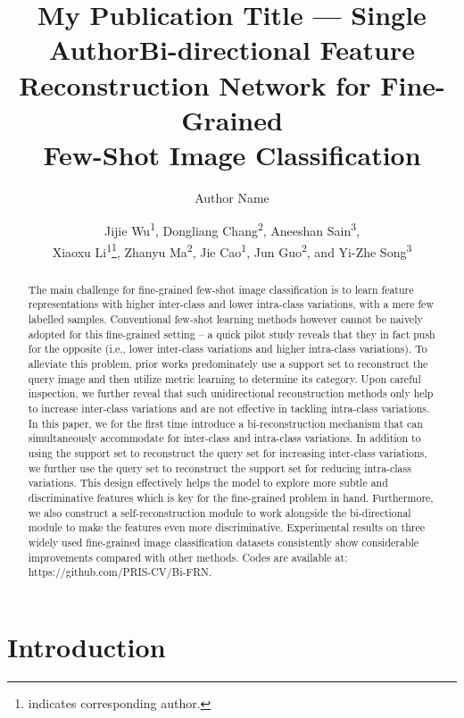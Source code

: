 \documentclass[letterpaper]{article} %
\title{My Publication Title --- Single Author}
\author {
    Author Name
}
\title{Bi-directional Feature Reconstruction Network for Fine-Grained \\ Few-Shot Image Classification}
\author {
    Jijie Wu\textsuperscript{\rm 1},
    Dongliang Chang\textsuperscript{\rm 2},
    Aneeshan Sain\textsuperscript{\rm 3},\\
    Xiaoxu Li\textsuperscript{\rm 1}\thanks{indicates corresponding author.},
    Zhanyu Ma\textsuperscript{\rm 2},
    Jie Cao\textsuperscript{\rm 1},
    Jun Guo\textsuperscript{\rm 2},
    and Yi-Zhe Song\textsuperscript{\rm 3}
}
\begin{document}
\maketitle

\begin{abstract}
The main challenge for fine-grained few-shot image classification is to learn feature representations with higher inter-class and lower intra-class variations, with a mere few labelled samples. Conventional few-shot learning methods however cannot be naively adopted for this fine-grained setting -- a quick pilot study reveals that they in fact push for the opposite (i.e., lower inter-class variations and higher intra-class variations). To alleviate this problem, prior works predominately use a support set to reconstruct the query image and then utilize metric learning to determine its category. Upon careful inspection, we further reveal that such unidirectional reconstruction methods only help to increase inter-class variations and are not effective in tackling intra-class variations. In this paper, we for the first time introduce a bi-reconstruction mechanism that can simultaneously accommodate for inter-class and intra-class variations. In addition to using the support set to reconstruct the query set for increasing inter-class variations, we further use the query set to reconstruct the support set for reducing intra-class variations. This design effectively helps the model to explore more subtle and discriminative features which is key for the fine-grained problem in hand. Furthermore, we also construct a self-reconstruction module to work alongside the bi-directional module to make the features even more discriminative. Experimental results on three widely used fine-grained image classification datasets consistently show considerable improvements compared with other methods.
Codes are available at: https://github.com/PRIS-CV/Bi-FRN.
\end{abstract}

\section{Introduction}
\end{document}
